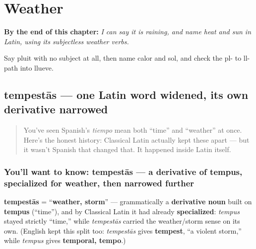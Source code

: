
\chapter{Weather}
\label{ch:la-weather}

\begin{chapteropening}
\textbf{By the end of this chapter:} \emph{I can say it is raining, and name heat and sun in Latin, using its subjectless weather verbs.}

Say pluit with no subject at all, then name calor and sol, and check the pl- to ll- path into llueve.
\end{chapteropening}

\section[tempestās]{tempestās — one Latin word widened, its own derivative narrowed}

\label{lesson:LA-C15-tempestas-pluit}



\begin{quote}
You've seen Spanish's \emph{tiempo} mean both \textquotedblleft{}time\textquotedblright{} and \textquotedblleft{}weather\textquotedblright{} at once. Here's the honest history: Classical Latin actually kept these apart — but it wasn't Spanish that changed that. It happened inside Latin itself.
\end{quote}

\subsection*{You'll want to know: tempestās — a derivative of tempus, specialized for weather, then narrowed further}
\textbf{tempestās} = \textquotedblleft{}\textbf{weather, storm}\textquotedblright{} — grammatically a \textbf{derivative noun} built on \textbf{tempus} (\textquotedblleft{}time\textquotedblright{}), and by Classical Latin it had already \textbf{specialized}: \emph{tempus} stayed strictly \textquotedblleft{}time,\textquotedblright{} while \emph{tempestās} carried the weather/storm sense on its own. (English kept this split too: \emph{tempestās} gives \textbf{tempest}, \textquotedblleft{}a violent storm,\textquotedblright{} while \emph{tempus} gives \textbf{temporal, tempo}.)

